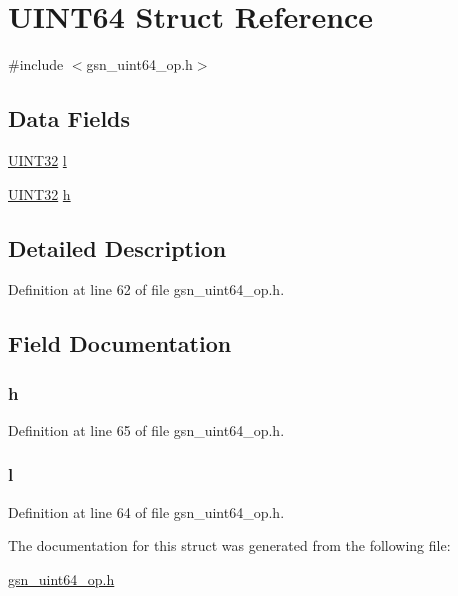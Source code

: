 \hypertarget{a00462}{
\section{UINT64 Struct Reference}
\label{a00462}
}


{\ttfamily \#include $<$gsn\_\-uint64\_\-op.h$>$}

\subsection*{Data Fields}
\begin{DoxyCompactItemize}
\item 
\hyperlink{a00660_gae1e6edbbc26d6fbc71a90190d0266018}{UINT32} \hyperlink{a00462_aa400d51b7c81db1ac70b006d53c59b3d}{l}
\item 
\hyperlink{a00660_gae1e6edbbc26d6fbc71a90190d0266018}{UINT32} \hyperlink{a00462_a66c4a9afa86897e1dfea9dad03f8e382}{h}
\end{DoxyCompactItemize}


\subsection{Detailed Description}


Definition at line 62 of file gsn\_\-uint64\_\-op.h.



\subsection{Field Documentation}
\hypertarget{a00462_a66c4a9afa86897e1dfea9dad03f8e382}{
\subsubsection[{h}]{ {\bf h}}}
\label{a00462_a66c4a9afa86897e1dfea9dad03f8e382}


Definition at line 65 of file gsn\_\-uint64\_\-op.h.

\hypertarget{a00462_aa400d51b7c81db1ac70b006d53c59b3d}{
\subsubsection[{l}]{ {\bf l}}}
\label{a00462_aa400d51b7c81db1ac70b006d53c59b3d}


Definition at line 64 of file gsn\_\-uint64\_\-op.h.



The documentation for this struct was generated from the following file:\begin{DoxyCompactItemize}
\item 
\hyperlink{a00601}{gsn\_\-uint64\_\-op.h}\end{DoxyCompactItemize}
